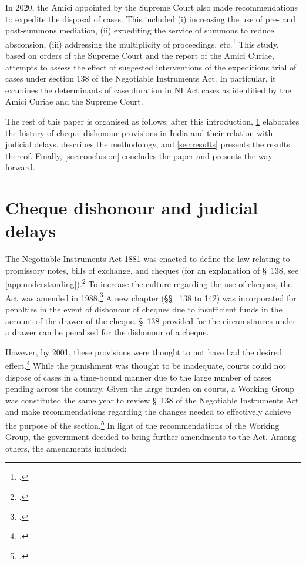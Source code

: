 In 2020, the Amici appointed by the Supreme Court also made recommendations to expedite the disposal of cases. This included (i) increasing the use of pre- and post-summons mediation, (ii) expediting the service of summons to reduce absconsion, (iii) addressing the multiplicity of proceedings, etc.\footcite{amicus2020_submission} This study, based on orders of the Supreme Court and the report of the Amici Curiae, attempts to assess the effect of suggested interventions of the expeditious trial of cases under section 138 of the Negotiable Instruments Act. In particular, it examines the determinants of case duration in NI Act cases as identified by the Amici Curiae and the Supreme Court.

The rest of this paper is organised as follows: after this introduction, \cref{sec:history} elaborates the history of cheque dishonour provisions in India and their relation with judicial delays.  describes the methodology, and \cref{sec:results} presents the results thereof. Finally, \cref{sec:conclusion} concludes the paper and presents the way forward.

\section{Cheque dishonour and judicial delays}
\label{sec:history}

The Negotiable Instruments Act 1881 was enacted to define the law relating to promissory notes, bills of exchange, and cheques (for an explanation of \S~138, see \cref{app:understanding}).\footcite{ind1881_niAct} To increase the culture regarding the use of cheques, the Act was amended in 1988.\footcite{niAmend1988} A new chapter (\S\S~ 138 to 142) was incorporated for penalties in the event of dishonour of cheques due to insufficient funds in the account of the drawer of the cheque. \S~138 provided for the circumstances under a drawer can be penalised for the dishonour of a cheque.

However, by 2001, these provisions were thought to not have had the desired effect.\footcite{stdcomm2001_138niAct} While the punishment was thought to be inadequate, courts could not dispose of cases in a time-bound manner due to the large number of cases pending across the country. Given the large burden on courts, a Working Group was constituted the same year to review \S~138 of the Negotiable Instruments Act and make recommendations regarding the changes needed to effectively achieve the purpose of the section.\footcite{wg2001_138} In light of the recommendations of the Working Group, the government decided to bring further amendments to the Act. Among others, the amendments included:

